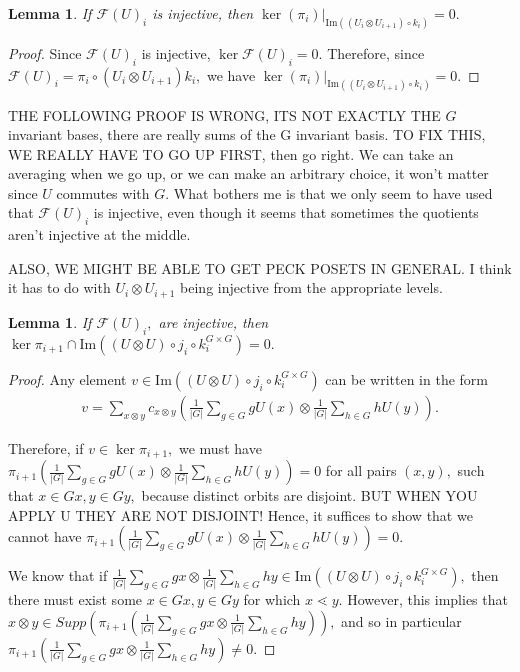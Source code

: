 \documentclass{amsart}
\newtheorem{lem}[subsubsection]{Lemma}
\newcommand\im{\text{Im}}
\begin{document}
\begin{lem}
If $\mathcal F(U)_i$ is injective, then $\ker(\pi_i)|_{\im((U_i \otimes U_{i+1})\circ k_i)}=0.$
\end{lem}
\begin{proof}
Since $\mathcal F(U)_i$ is injective, $\ker \mathcal F(U)_i  = 0.$ Therefore, since $\mathcal F(U)_i = \pi_i \circ (U_i\otimes U_{i+1}) k_i,$ we have $\ker(\pi_i)|_{\im((U_i \otimes U_{i+1})\circ k_i)}=0.$
\end{proof}
THE FOLLOWING PROOF IS WRONG, ITS NOT EXACTLY THE $G$ invariant bases, there are really sums of the G invariant basis. TO FIX THIS, WE REALLY HAVE TO GO UP FIRST, then go right. We can take an averaging when we go up, or we can make an arbitrary choice, it won't matter since $U$ commutes with $G.$ What bothers me is that we only seem to have used that $\mathcal F(U)_i$ is injective, even though it seems that sometimes the quotients aren't injective at the middle.

ALSO, WE MIGHT BE ABLE TO GET PECK POSETS IN GENERAL. I think it has to do with $U_i \otimes U_{i+1}$ being injective from the appropriate levels.

\begin{lem}
\label{no_pi_kernel}
If $\mathcal F(U)_i,$ are injective, then $\ker \pi_{i+1} \cap \im((U\otimes U)\circ j_i\circ k^{G\times G}_i)=0.$
\end{lem}
\begin{proof}
Any element $v \in \im((U\otimes U)\circ j_i\circ k^{G\times G}_i)$ can be written in the form 
\begin{align*}
	v=\sum_{x\otimes y}^{}c_{x\otimes y}\left(\frac{1}{|G|}\sum_{g \in G}^{} gU(x)\otimes \frac{1}{|G|}\sum_{h\in G}^{}hU(y)\right).
\end{align*}

Therefore, if $v \in \ker \pi_{i+1},$ we must have $\pi_{i+1}\left(\frac{1}{|G|}\sum_{g \in G}^{} gU(x)\otimes \frac{1}{|G|}\sum_{h\in G}^{}hU(y)\right) = 0$ for all pairs $(x,y),$ such that $x \in Gx,y \in Gy,$ because distinct orbits are disjoint. BUT WHEN YOU APPLY U THEY ARE NOT DISJOINT! Hence, it suffices to show that we cannot have $\pi_{i+1}\left(\frac{1}{|G|}\sum_{g \in G}^{} gU(x)\otimes \frac{1}{|G|}\sum_{h\in G}^{}hU(y)\right) = 0.$

We know that if $\frac{1}{|G|}\sum_{g \in G}^{} gx\otimes \frac{1}{|G|}\sum_{h\in G}^{}hy \in \im((U\otimes U)\circ j_i\circ k^{G\times G}_i),$ then there must exist some $x \in Gx,y \in Gy$ for which $x \lessdot y.$ However, this implies that $x \otimes y \in Supp\left(\pi_{i+1}\left(\frac{1}{|G|}\sum_{g \in G}^{} gx\otimes \frac{1}{|G|}\sum_{h\in G}^{}hy\right)\right),$ and so in particular $\pi_{i+1}\left(\frac{1}{|G|}\sum_{g \in G}^{} gx\otimes \frac{1}{|G|}\sum_{h\in G}^{}hy\right) \neq 0.$
\end{proof}
\end{document}
